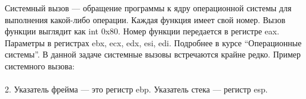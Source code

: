 \documentclass[12pt, letterpaper]{article}
\begin{document}
\noindent Системный вызов — обращение программы к ядру операционной системы для выполнения какой-либо операции. Каждая функция имеет свой номер. Вызов функции выглядит как int 0x80. Номер функции передается в регистре eax. Параметры в регистрах ebx, ecx, edx, esi, edi. Подробнее в курсе ``Операционные системы''. В данной задаче системные вызовы встречаются крайне редко. Пример системного вызова:\\
\\

2. Указатель фрейма — это регистр ebp. Указатель стека — регистр esp.\\
\end{document}
